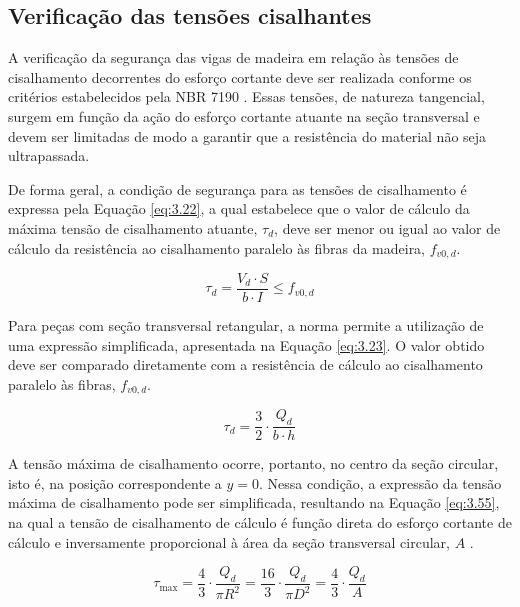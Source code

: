 \begin{quadro}[htpb!]
\subsection{Verificação das tensões cisalhantes}

A verificação da segurança das vigas de madeira em relação às tensões de cisalhamento decorrentes do esforço cortante deve ser realizada conforme os critérios estabelecidos pela NBR 7190 \parencite{NBR7190-1:2022}. Essas tensões, de natureza tangencial, surgem em função da ação do esforço cortante atuante na seção transversal e devem ser limitadas de modo a garantir que a resistência do material não seja ultrapassada.

De forma geral, a condição de segurança para as tensões de cisalhamento é expressa pela Equação \eqref{eq:3.22}, a qual estabelece que o valor de cálculo da máxima tensão de cisalhamento atuante, $\tau_d$, deve ser menor ou igual ao valor de cálculo da resistência ao cisalhamento paralelo às fibras da madeira, $f_{v0,d}$. 

\begin{equation}
\tau_d = \frac{V_d \cdot S}{b \cdot I} \leq f_{v0,d}
\label{eq:3.22}
\end{equation}

Para peças com seção transversal retangular, a norma permite a utilização de uma expressão simplificada, apresentada na Equação \eqref{eq:3.23}. O valor obtido deve ser comparado diretamente com a resistência de cálculo ao cisalhamento paralelo às fibras, $f_{v0,d}$.

\begin{equation}
\tau_d = \frac{3}{2} \cdot \frac{Q_d}{b \cdot h}
\label{eq:3.23}
\end{equation}

A tensão máxima de cisalhamento ocorre, portanto, no centro da seção circular, isto é, na posição correspondente a $y = 0$. Nessa condição, a expressão da tensão máxima de cisalhamento pode ser simplificada, resultando na Equação \eqref{eq:3.55}, na qual a tensão de cisalhamento de cálculo é função direta do esforço cortante de cálculo e inversamente proporcional à área da seção transversal circular, $A$ \parencite{Moraes2023}.

\begin{equation}
\tau_{\max} =
\frac{4}{3} \cdot \frac{Q_d}{\pi R^{2}}
=
\frac{16}{3} \cdot \frac{Q_d}{\pi D^{2}}
=
\frac{4}{3} \cdot \frac{Q_d}{A}
\label{eq:3.55}
\end{equation}


\end{quadro}

